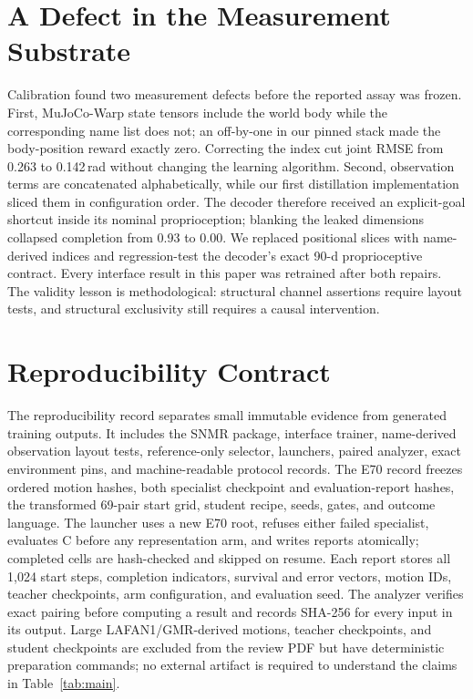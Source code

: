 \documentclass[conference]{IEEEtran}
\begin{document}
\section{A Defect in the Measurement Substrate}
\label{sec:defect}
Calibration found two measurement defects before the reported assay was frozen.  First,
MuJoCo-Warp state tensors include the world body while the corresponding name list does
not; an off-by-one in our pinned stack made the body-position reward exactly zero.
Correcting the index cut joint RMSE from 0.263 to 0.142\,rad without changing the
learning algorithm.  Second, observation terms are concatenated alphabetically, while
our first distillation implementation sliced them in configuration order.  The decoder
therefore received an explicit-goal shortcut inside its nominal proprioception; blanking
the leaked dimensions collapsed completion from 0.93 to 0.00.  We replaced positional
slices with name-derived indices and regression-test the decoder's exact 90-d
proprioceptive contract.  Every interface result in this paper was retrained after both
repairs.  The validity lesson is methodological: structural channel assertions require
layout tests, and structural exclusivity still requires a causal intervention.

\section{Reproducibility Contract}
The reproducibility record separates small immutable evidence from generated training
outputs.  It includes the SNMR package, interface trainer, name-derived observation
layout tests, reference-only selector, launchers, paired analyzer, exact environment
pins, and machine-readable protocol records.  The E70 record freezes ordered motion
hashes, both specialist checkpoint and evaluation-report hashes, the transformed
69-pair start grid, student recipe, seeds, gates, and outcome language.  The launcher
uses a new E70 root, refuses either failed specialist, evaluates C before any
representation arm, and writes reports atomically; completed cells are hash-checked and
skipped on resume.  Each report stores all 1,024 start steps, completion indicators,
survival and error vectors, motion IDs, teacher checkpoints, arm configuration, and
evaluation seed.  The analyzer verifies exact pairing before computing a result and
records SHA-256 for every input in its output.  Large LAFAN1/GMR-derived motions,
teacher checkpoints, and student checkpoints are excluded from the review PDF but have
deterministic preparation commands; no external artifact is required to understand the
claims in Table~\ref{tab:main}.
\end{document}
